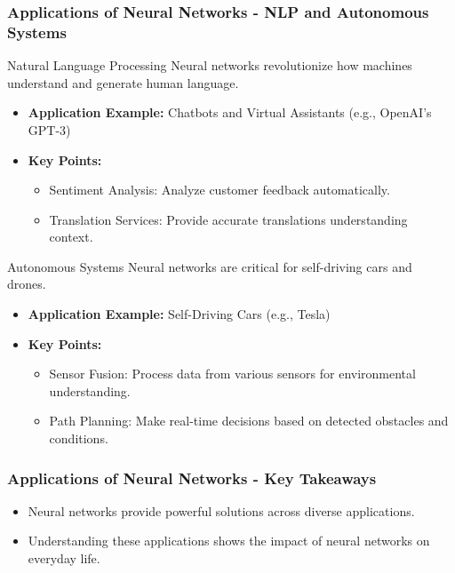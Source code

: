 \documentclass[aspectratio=169]{beamer}
\begin{document}
\begin{frame}[fragile]
    \frametitle{Applications of Neural Networks - NLP and Autonomous Systems}
    \begin{block}{Natural Language Processing}
        Neural networks revolutionize how machines understand and generate human language.
    \end{block}
    \begin{itemize}
        \item \textbf{Application Example:} Chatbots and Virtual Assistants (e.g., OpenAI's GPT-3)
        \item \textbf{Key Points:}
        \begin{itemize}
            \item Sentiment Analysis: Analyze customer feedback automatically.
            \item Translation Services: Provide accurate translations understanding context.
        \end{itemize}
    \end{itemize}

    \begin{block}{Autonomous Systems}
        Neural networks are critical for self-driving cars and drones.
    \end{block}
    \begin{itemize}
        \item \textbf{Application Example:} Self-Driving Cars (e.g., Tesla)
        \item \textbf{Key Points:}
        \begin{itemize}
            \item Sensor Fusion: Process data from various sensors for environmental understanding.
            \item Path Planning: Make real-time decisions based on detected obstacles and conditions.
        \end{itemize}
    \end{itemize}
\end{frame}

\begin{frame}[fragile]
    \frametitle{Applications of Neural Networks - Key Takeaways}
    \begin{itemize}
        \item Neural networks provide powerful solutions across diverse applications.
        \item Understanding these applications shows the impact of neural networks on everyday life.
    \end{itemize}
\end{frame}
\end{document}
